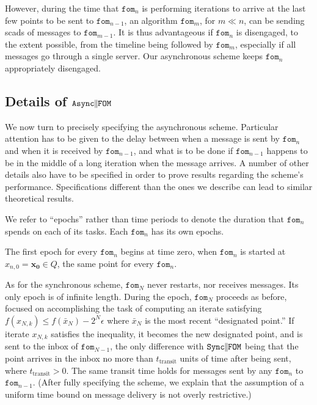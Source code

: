 \documentclass[reqno, 11pt]{amsart}
\numberwithin{equation}{section}
\newcommand{\nt}{\negthinspace}
\newcommand{\fom}{\mathtt{fom}}
\newcommand{\parfom}{\parallel \nt \nt  \mathtt{FOM}}
\newcommand{\ttransit}{t_{\mathrm{transit}}}
\newcommand{\sparfom}{\mathtt{Sync} \nt \nt  \parfom}
\newcommand{\aparfom}{\mathtt{Async} \nt \nt \parfom}
\begin{document}
However, during the time that $ \fom_n $ is performing iterations to arrive at the last few points to be sent to $ \fom_{n-1} $,  an algorithm $ \fom_m $, for $ m \ll n $, can be sending scads of messages to $ \fom_{m-1} $. It is thus advantageous if $ \fom_n $ is disengaged, to the extent possible, from the timeline being followed by $ \fom_m $, especially if all messages go through a single server. Our asynchronous scheme keeps $ \fom_n $ appropriately disengaged. 

\subsection{Details of $ \aparfom $} \label{sect.ga} 

We now turn to precisely specifying the asynchronous scheme. Particular attention has to be given to the delay between when a message is sent by $ \fom_n $ and when it is received by $ \fom_{n-1} $, and what is to be done if $ \fom_{n-1} $ happens to be in the middle of a long iteration when the message arrives. A number of other details also have to be specified in order to prove results regarding the scheme's performance. Specifications different than the ones we describe can lead to similar theoretical results.

We refer to ``epochs'' rather than time periods to denote the duration that $\fom_n $ spends on each of its tasks. Each $ \fom_n $ has its own epochs. 

The first epoch for every $ \fom_n $ begins at time zero, when $ \fom_n $ is started at $ x_{n,0} = \mathbf{x_0} \in Q $, the same point for every $ \fom_n $. 

As for the synchronous scheme, $ \fom_{N} $ never restarts, nor receives messages. Its only epoch is of infinite length.  During the epoch, $ \fom_{N} $ proceeds as before, focused on accomplishing the task of computing an iterate satisfying $ f(x_{N,k}) \leq f(\bar{x}_N ) - 2^{N} \epsilon $ where $ \bar{x}_N $ is the most recent ``designated point.'' If iterate $ x_{N,k} $ satisfies the inequality, it becomes the new designated point, and is sent to the inbox of $ \fom_{N-1} $, the only difference with $ \sparfom $ being that the point arrives in the inbox  no more than $ \ttransit $ units of time after being sent, where $ \ttransit > 0 $.  The same transit time holds for messages sent by any $ \fom_n $ to $ \fom_{n-1} $. (After fully specifying the scheme, we explain that the assumption of a uniform time bound on message delivery is not overly restrictive.)
\end{document}
